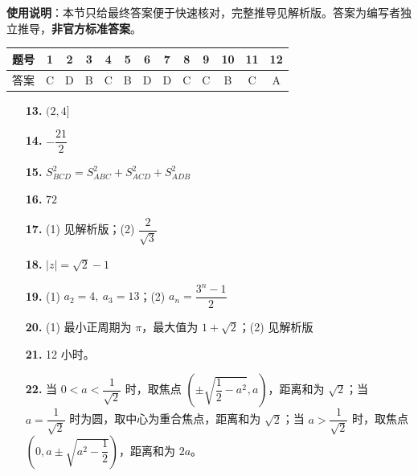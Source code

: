 
\begin{gknotice}
\textbf{使用说明}：本节只给最终答案便于快速核对，完整推导见解析版。答案为编写者独立推导，\textbf{非官方标准答案}。
\end{gknotice}

\begin{center}\begin{tabular}{ccccccccccccc}
\toprule
题号 & 1 & 2 & 3 & 4 & 5 & 6 & 7 & 8 & 9 & 10 & 11 & 12 \\
\midrule
答案 & C & D & B & C & B & D & D & C & C & B & C & A \\
\bottomrule
\end{tabular}\end{center}

\begin{itemize}[leftmargin=2.6em]
  \item[\textbf{13.}] $(2,4]$
  \item[\textbf{14.}] $-\dfrac{21}{2}$
  \item[\textbf{15.}] $S_{BCD}^2=S_{ABC}^2+S_{ACD}^2+S_{ADB}^2$
  \item[\textbf{16.}] $72$
\end{itemize}

\begin{itemize}[leftmargin=2.6em]
  \item[\textbf{17.}] (1) 见解析版；(2) $\dfrac{2}{\sqrt3}$
  \item[\textbf{18.}] $|z|=\sqrt2-1$
  \item[\textbf{19.}] (1) $a_2=4,\ a_3=13$；(2) $a_n=\dfrac{3^n-1}{2}$
  \item[\textbf{20.}] (1) 最小正周期为 $\pi$，最大值为 $1+\sqrt2$；(2) 见解析版
  \item[\textbf{21.}] 12 小时。
  \item[\textbf{22.}] 当 $0<a<\dfrac1{\sqrt2}$ 时，取焦点 $\left(\pm\sqrt{\dfrac12-a^2},a\right)$，距离和为 $\sqrt2$；当 $a=\dfrac1{\sqrt2}$ 时为圆，取中心为重合焦点，距离和为 $\sqrt2$；当 $a>\dfrac1{\sqrt2}$ 时，取焦点 $\left(0,a\pm\sqrt{a^2-\dfrac12}\right)$，距离和为 $2a$。
\end{itemize}
